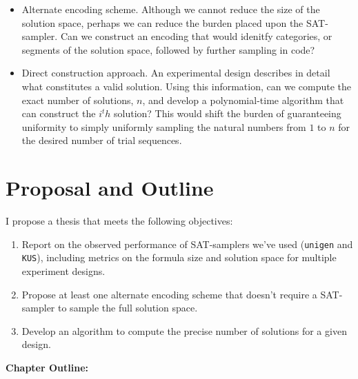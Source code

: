 \documentclass[a4paper]{article}
\begin{document}
\begin{itemize}
\item Alternate encoding scheme. Although we cannot reduce the size of the solution space, perhaps we can reduce the burden placed upon the SAT-sampler. Can we construct an encoding that would idenitfy categories, or segments of the solution space, followed by further sampling in code?
\item Direct construction approach. An experimental design describes in detail what constitutes a valid solution. Using this information, can we compute the exact number of solutions, $n$, and develop a polynomial-time algorithm that can construct the $i^th$ solution? This would shift the burden of guaranteeing uniformity to simply uniformly sampling the natural numbers from $1$ to $n$ for the desired number of trial sequences.
\end{itemize}


\section*{Proposal and Outline}

I propose a thesis that meets the following objectives:

\begin{enumerate}
\item Report on the observed performance of SAT-samplers we've used (\texttt{unigen} and \texttt{KUS}), including metrics on the formula size and solution space for multiple experiment designs.
\item Propose at least one alternate encoding scheme that doesn't require a SAT-sampler to sample the full solution space.
\item Develop an algorithm to compute the precise number of solutions for a given design.
\end{enumerate}

\textbf{Chapter Outline:}
\end{document}
